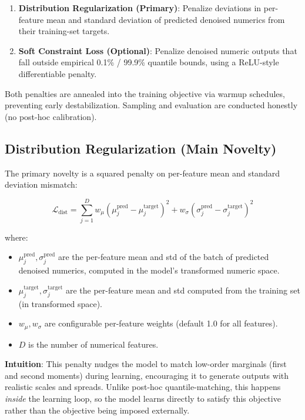 \documentclass{article}
\begin{document}
\begin{enumerate}
  \item \textbf{Distribution Regularization (Primary)}: Penalize deviations in per-feature mean and standard deviation of predicted denoised numerics from their training-set targets.
  
  \item \textbf{Soft Constraint Loss (Optional)}: Penalize denoised numeric outputs that fall outside empirical 0.1\% / 99.9\% quantile bounds, using a ReLU-style differentiable penalty.
\end{enumerate}

Both penalties are annealed into the training objective via warmup schedules, preventing early destabilization. Sampling and evaluation are conducted honestly (no post-hoc calibration).

\subsection{Distribution Regularization (Main Novelty)}

The primary novelty is a squared penalty on per-feature mean and standard deviation mismatch:

\begin{equation}
\mathcal{L}_{\text{dist}} = \sum_{j=1}^{D} w_{\mu} \left( \mu_j^{\text{pred}} - \mu_j^{\text{target}} \right)^2 + w_{\sigma} \left( \sigma_j^{\text{pred}} - \sigma_j^{\text{target}} \right)^2
\end{equation}

where:
\begin{itemize}
  \item $\mu_j^{\text{pred}}, \sigma_j^{\text{pred}}$ are the per-feature mean and std of the batch of predicted denoised numerics, computed in the model's transformed numeric space.
  \item $\mu_j^{\text{target}}, \sigma_j^{\text{target}}$ are the per-feature mean and std computed from the training set (in transformed space).
  \item $w_{\mu}, w_{\sigma}$ are configurable per-feature weights (default 1.0 for all features).
  \item $D$ is the number of numerical features.
\end{itemize}

\textbf{Intuition}: This penalty nudges the model to match low-order marginals (first and second moments) during learning, encouraging it to generate outputs with realistic scales and spreads. Unlike post-hoc quantile-matching, this happens \textit{inside} the learning loop, so the model learns directly to satisfy this objective rather than the objective being imposed externally.
\end{document}
